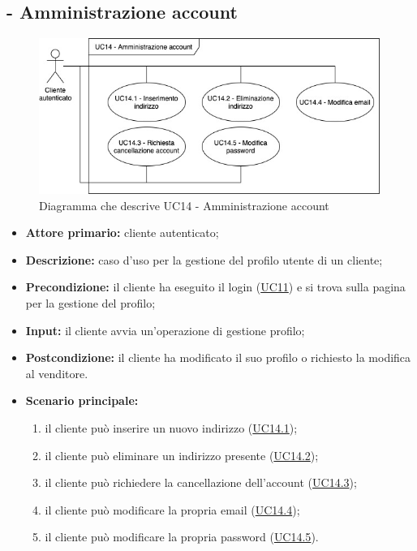 \stepUserCase
\subsection{ - Amministrazione account}
\begin{figure}[H]
    \centering
    \includegraphics[width=30em]{res/images/UC/UC14.jpg}
    \caption{Diagramma che descrive UC14 - Amministrazione account}
\end{figure}
\begin{itemize}
    \item \textbf{Attore primario:} cliente autenticato;
    \item \textbf{Descrizione:} caso d'uso per la gestione del profilo utente di un cliente;
    \item \textbf{Precondizione:} il cliente ha eseguito il login (\hyperref[UC11]{UC11}) e si trova sulla pagina per la gestione del profilo;
    \item \textbf{Input:} il cliente avvia un'operazione di gestione profilo;
    \item \textbf{Postcondizione:} il cliente ha modificato il suo profilo o richiesto la modifica al venditore.
    \item \textbf{Scenario principale:}
          \begin{enumerate}
              \item il cliente può inserire un nuovo indirizzo (\hyperref[UC14.1]{UC14.1});
              \item il cliente può eliminare un indirizzo presente (\hyperref[UC14.2]{UC14.2});
              \item il cliente può richiedere la cancellazione dell'account (\hyperref[UC14.3]{UC14.3});
              \item il cliente può modificare la propria email (\hyperref[UC14.4]{UC14.4});
              \item il cliente può modificare la propria password (\hyperref[UC14.5]{UC14.5}).
            
          \end{enumerate}
\end{itemize}

